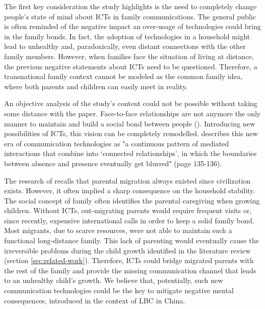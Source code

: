 The first key consideration the study highlights is the need to completely change people's state of mind about ICTs in family communications. The general public is often reminded of the negative impact an over-usage of technologies could bring in the family bonds. In fact, the adoption of technologies in a household might lead to unhealthy and, paradoxically, even distant connections with the other family members. However, when families face the situation of living at distance, the previous negative statements about ICTs need to be questioned. Therefore, a transnational family context cannot be modeled as the common family idea, where both parents and children can easily meet in reality.

An objective analysis of the study's content could not be possible without taking some distance with the paper. Face-to-face relationships are not anymore the only manner to maintain and build a social bond between people (\cite{bacigalupe2011virtualizing}). Introducing new possibilities of ICTs, this vision can be completely remodelled. \textcite{licoppe2004connected} describes this new era of communication technologies as "a continuous pattern of mediated interactions that combine into `connected relationships', in which the boundaries between absence and presence eventually get blurred" (page 135-136).

The research of \textcite{bacigalupe2011virtualizing} recalls that parental migration always existed since civilization exists. However, it often implied a sharp consequence on the household stability. The social concept of family often identifies the parental caregiving when growing children. Without ICTs, out-migrating parents would require frequent visits or, since recently, expensive international calls in order to keep a solid family bond. Most migrants, due to scarce resources, were not able to maintain such a functional long-distance family. This lack of parenting would eventually cause the irreversible problems during the child growth identified in the literature review (section \ref{sec:related-work}). Therefore, ICTs could bridge migrated parents with the rest of the family and provide the missing communication channel that leads to an unhealthy child's growth. We believe that, potentially, such new communication technologies could be the key to mitigate negative mental consequences, introduced in the context of LBC in China.

